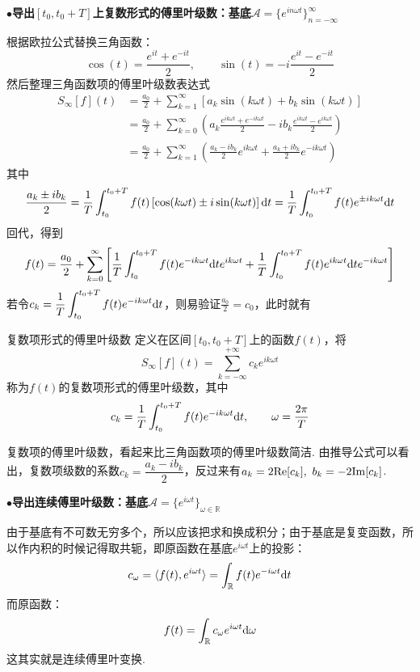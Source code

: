 \documentclass[main.tex]{subfiles}
\begin{document}
\vspace{1cm}
\noindent \textbf{
\(\bullet\)导出\([t_0, t_0+T]\)上复数形式的傅里叶级数：基底\(\mathcal{A}=\{e^{in\omega t}\}_{n=-\infty}^{\infty}\)
}

根据欧拉公式替换三角函数：
\[ \cos(t) = \frac{e^{it}+e^{-it}}{2}, \qquad \sin(t) = -i\frac{e^{it}-e^{-it}}{2} \]
然后整理三角函数项的傅里叶级数表达式
\begin{align*}
    S_{\infty}[f](t) &= \frac{a_0}{2}+\sum_{k=1}^{\infty} \left[a_k\sin(k\omega t)+b_k\sin(k\omega t)\right] \\
    &= \frac{a_0}{2} + \sum_{k=0}^{\infty}\left(a_k\frac{e^{ik\omega t}+e^{-ik\omega t}}{2}-ib_k\frac{e^{ik\omega t}-e^{ik\omega t}}{2} \right) \\
    &= \frac{a_0}{2}+\sum_{k=1}^{\infty}\left( \frac{a_k-ib_k}{2}e^{ik\omega t}+\frac{a_k+ib_k}{2}e^{-ik\omega t}\right)
\end{align*}
其中
\[\frac{a_k \pm ib_k}{2} = \frac{1}{T}\int_{t_0}^{t_0+T}f(t)\left[\cos(k\omega t) \pm i\sin(k\omega t) \right] {\rm d}t = \frac{1}{T}\int_{t_0}^{t_0+T}f(t)e^{\pm ik\omega t}{\rm d}t\]
回代，得到
\[f(t) = \frac{a_0}{2} + \sum_{k=0}^{\infty}\left[ \frac{1}{T} \int_{t_0}^{t_0+T}f(t)e^{-ik\omega t}{\rm d}te^{ik\omega t}+ \frac{1}{T}\int_{t_0}^{t_0+T}f(t)e^{ik\omega t}{\rm d}te^{-ik\omega t}\right]\]
若令\(\displaystyle{c_k = \frac{1}{T} \int_{t_0}^{t_0+T}f(t)e^{-ik\omega t}{\rm d}t}\)，则易验证\(\displaystyle{\frac{a_0}{2} = c_0}\)，此时就有
\begin{definition}{复数项形式的傅里叶级数}
    定义在区间\([t_0,t_0+T]\)上的函数\(f(t)\)，将
    \[S_{\infty}[f](t) = \sum_{k=-\infty}^{+\infty}c_ke^{ik\omega t}\]
    称为\(f(t)\)的复数项形式的傅里叶级数，其中
    \[c_k = \frac{1}{T} \int_{t_0}^{t_0+T}f(t)e^{-ik\omega t}{\rm d}t, \qquad \omega=\frac{2\pi}{T}\]
\end{definition}

复数项的傅里叶级数，看起来比三角函数项的傅里叶级数简洁. 由推导公式可以看出，复数项级数的系数\(c_k=\dfrac{a_k-ib_k}{2}\)，反过来有\(a_k=2{\rm Re}[c_k], \,\, b_k=-2{\rm Im}[c_k]\).

\vspace{1cm}
\noindent \textbf{
\(\bullet\)导出连续傅里叶级数：基底\(\mathcal{A}=\{e^{i\omega t}\}_{\omega \in \mathbb{R}}\)
}

由于基底有不可数无穷多个，所以应该把求和换成积分；由于基底是复变函数，所以作内积的时候记得取共轭，即原函数在基底\(e^{i\omega t}\)上的投影：
\[c_\omega = \langle f(t), e^{i\omega t} \rangle = \int_{\mathbb{R}}f(t)e^{-i\omega t}{\rm d}t\]
而原函数：
\[f(t) = \int_{\mathbb{R}}c_\omega e^{i\omega t}{\rm d}\omega\]
这其实就是连续傅里叶变换.
\end{document}

